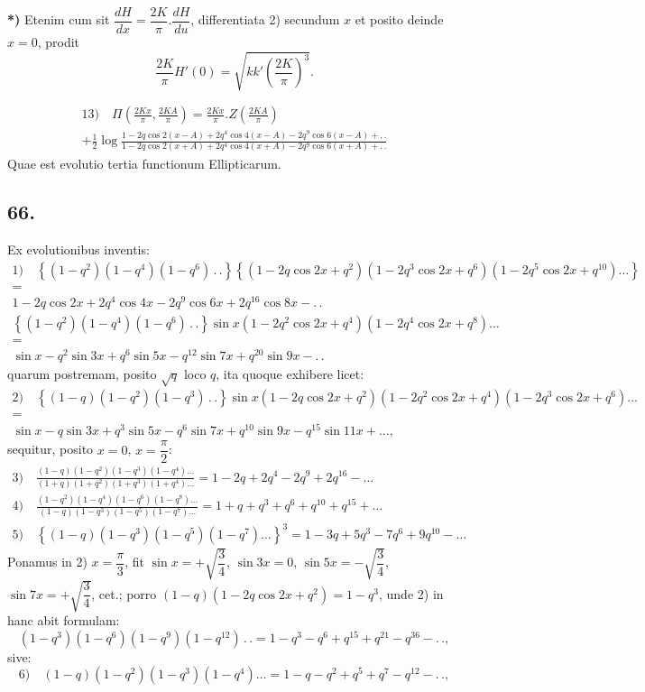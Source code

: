 \documentclass{article}
\begin{document}
\textbf{*)} Etenim cum sit $\dfrac{dH}{dx}=\dfrac{2K}{\pi}.\dfrac{dH}{du}$, differentiata 2) secundum $x$ et posito deinde $x=0$, prodit
\[
\frac{2K}{\pi}H'(0)=\sqrt{kk'\left(\frac{2K}{\pi}\right)^{3}}.
\]

\[
\begin{gathered}
\text{13)}\quad\Pi\left(\frac{2Kx}{\pi},\frac{2KA}{\pi}\right)=\frac{2Kx}{\pi}.Z\left(\frac{2KA}{\pi}\right)\\[1.5ex]
+\frac{1}{2}\log\frac{1-2q\cos 2(x-A)+2q^{4}\cos 4(x-A)-2q^{9}\cos 6(x-A)+.\,.}{1-2q\cos 2(x+A)+2q^{4}\cos 4(x+A)-2q^{9}\cos 6(x+A)+.\,.}
\end{gathered}
\]
Quae est evolutio tertia functionum Ellipticarum.

\subsection*{66.}

Ex evolutionibus inventis:
\[
\begin{gathered}
\text{1)}\quad\left\{(1-q^{2})(1-q^{4})(1-q^{6})\,.\,.\right\}\left\{(1-2q\cos 2x+q^{2})(1-2q^{3}\cos 2x+q^{6})(1-2q^{5}\cos 2x+q^{10})\ldots\right\}\\[1ex]
=\\[1ex]
1-2q\cos 2x+2q^{4}\cos 4x-2q^{9}\cos 6x+2q^{16}\cos 8x-.\,.\\[1.5ex]
\left\{(1-q^{2})(1-q^{4})(1-q^{6})\,.\,.\right\}\sin x(1-2q^{2}\cos 2x+q^{4})(1-2q^{4}\cos 2x+q^{8})\ldots\\[1ex]
=\\[1ex]
\sin x-q^{2}\sin 3x+q^{6}\sin 5x-q^{12}\sin 7x+q^{20}\sin 9x-.\,.
\end{gathered}
\]
quarum postremam, posito $\sqrt{q}$ loco $q$, ita quoque exhibere licet:
\[
\begin{gathered}
\text{2)}\quad\left\{(1-q)(1-q^{2})(1-q^{3})\,.\,.\right\}\sin x(1-2q\cos 2x+q^{2})(1-2q^{2}\cos 2x+q^{4})(1-2q^{3}\cos 2x+q^{6})\ldots\\[1ex]
=\\[1ex]
\sin x-q\sin 3x+q^{3}\sin 5x-q^{6}\sin 7x+q^{10}\sin 9x-q^{15}\sin 11x+\ldots,
\end{gathered}
\]
sequitur, posito $x=0$, $x=\dfrac{\pi}{2}$:
\[
\begin{gathered}
\text{3)}\quad\frac{(1-q)(1-q^{2})(1-q^{3})(1-q^{4})\ldots}{(1+q)(1+q^{2})(1+q^{3})(1+q^{4})\ldots}=1-2q+2q^{4}-2q^{9}+2q^{16}-\ldots\\[2ex]
\text{4)}\quad\frac{(1-q^{2})(1-q^{4})(1-q^{6})(1-q^{8})\ldots}{(1-q)(1-q^{3})(1-q^{5})(1-q^{7})\ldots}=1+q+q^{3}+q^{6}+q^{10}+q^{15}+\ldots\\[2ex]
\text{5)}\quad\left\{(1-q)(1-q^{3})(1-q^{5})(1-q^{7})\ldots\right\}^{3}=1-3q+5q^{3}-7q^{6}+9q^{10}-\ldots
\end{gathered}
\]
Ponamus in 2) $x=\dfrac{\pi}{3}$, fit $\sin x=+\sqrt{\dfrac{3}{4}}$, $\sin 3x=0$, $\sin 5x=-\sqrt{\dfrac{3}{4}}$, $\sin 7x=+\sqrt{\dfrac{3}{4}}$, cet.; porro $(1-q)(1-2q\cos 2x+q^{2})=1-q^{3}$, unde 2) in hanc abit formulam:
\[
(1-q^{3})(1-q^{6})(1-q^{9})(1-q^{12})\,.\,.=1-q^{3}-q^{6}+q^{15}+q^{21}-q^{36}-.\,.,
\]
sive:
\[
\text{6)}\quad(1-q)(1-q^{2})(1-q^{3})(1-q^{4})\ldots=1-q-q^{2}+q^{5}+q^{7}-q^{12}-.\,.,
\]
\end{document}
